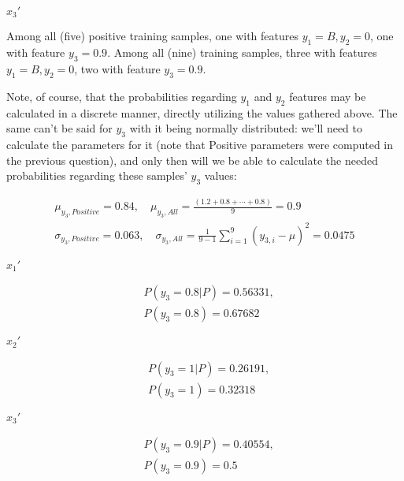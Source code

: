 \documentclass[12pt]{article}
\begin{document}
\begin{enumerate}[leftmargin=\labelsep]
\begin{multicols}{3}
    \columnbreak

    $x_3'$

    Among all (five) positive training samples, one with features $y_1 = B, y_2 = 0$,
    one with feature $y_3 = 0.9$.
    Among all (nine) training samples, three with features $y_1 = B, y_2 = 0$,
    two with feature $y_3 = 0.9$.

  \end{multicols}

  Note, of course, that the probabilities regarding $y_1$ and $y_2$ features may
  be calculated in a discrete manner, directly utilizing the values gathered above.
  The same can't be said for $y_3$ with it being normally distributed:
  we'll need to calculate the parameters for it (note that Positive parameters were computed in the
  previous question), and only then will we be able to calculate the needed probabilities regarding
  these samples' $y_3$ values:

  \begin{align}
    \mu_{y_3, Positive} = 0.84, \quad \mu_{y_3, All} = \frac{(1.2 + 0.8 + \cdots + 0.8)}{9} = 0.9 \\
    \sigma_{y_3, Positive} = 0.063, \quad \sigma_{y_3, All} = \frac{1}{9 - 1} \sum_{i=1}^{9} (y_{3, i} - \mu)^2 = 0.0475
  \end{align}

  \begin{multicols}{3}
    \setlength{\columnseprule}{1pt}
    \def\columnseprulecolor{\color{black}}
    \centering

    $x_1'$

    $$
    \begin{aligned}
      &P(y_3 = 0.8 | P) = 0.56331, \\
      &P(y_3 = 0.8) = 0.67682
    \end{aligned}
    $$

    \columnbreak

    $x_2'$

    $$
    \begin{aligned}
      &P(y_3 = 1 | P) = 0.26191, \\
      &P(y_3 = 1) = 0.32318
    \end{aligned}
    $$

    \columnbreak

    $x_3'$

    $$
    \begin{aligned}
      &P(y_3 = 0.9 | P) = 0.40554, \\
      &P(y_3 = 0.9) = 0.5
    \end{aligned}
    $$


\end{multicols}
\end{enumerate}
\end{document}
